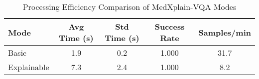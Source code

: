
\begin{table}[htbp]
\centering
\caption{Processing Efficiency Comparison of MedXplain-VQA Modes}
\label{tab:efficiency_comparison}
\begin{tabular}{lcccc}
\toprule
\textbf{Mode} & \textbf{Avg Time (s)} & \textbf{Std Time (s)} & \textbf{Success Rate} & \textbf{Samples/min} \\
\midrule
Basic & 1.9 & 0.2 & 1.000 & 31.7 \\
Explainable & 7.3 & 2.4 & 1.000 & 8.2 \\
\bottomrule
\end{tabular}
\end{table}
